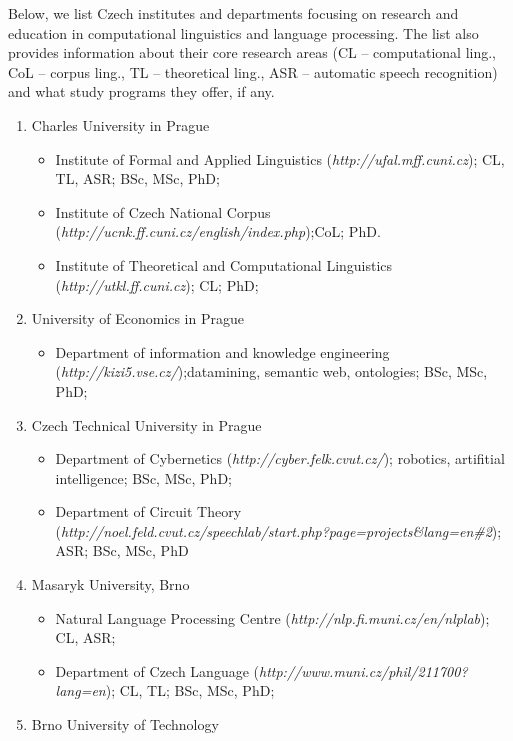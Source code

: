 \documentclass[]{../../metanetpaper}
\begin{document}
\begin{multicols}{2}
Below, we list Czech institutes and departments focusing on research and education in computational linguistics and language processing. The list also provides information about their core research areas (CL – computational ling., CoL – corpus ling., TL – theoretical ling., ASR – automatic speech recognition) and what study programs they offer, if any.

\begin{enumerate}
\item Charles University in Prague
  \begin{itemize}
  \item Institute of Formal and Applied Linguistics (\textit{http://ufal.mff.cuni.cz}); CL, TL, ASR; BSc, MSc, PhD;
  \item Institute of Czech National Corpus (\textit{http://ucnk.ff.cuni.cz/english/index.php});CoL; PhD.
  \item Institute of Theoretical and Computational Linguistics (\textit{http://utkl.ff.cuni.cz}); CL; PhD;
  \end{itemize}
\item University of Economics in Prague
  \begin{itemize}
  \item Department of information and knowledge engineering (\textit{http://kizi5.vse.cz/});datamining, semantic web, ontologies; BSc, MSc, PhD;
  \end{itemize}
\item Czech Technical University in Prague
  \begin{itemize}
  \item Department of Cybernetics (\textit{http://cyber.felk.cvut.cz/}); robotics, artifitial   intelligence; BSc, MSc, PhD;
  \item Department of Circuit Theory (\textit{http://noel.feld.cvut.cz/speechlab/start.php?page=projects\&lang=en\#2});  ASR; BSc, MSc, PhD
  \end{itemize}
\item Masaryk University, Brno
  \begin{itemize}
  \item Natural Language Processing Centre (\textit{http://nlp.fi.muni.cz/en/nlplab}); CL, ASR; 
  \item Department of Czech Language (\textit{http://www.muni.cz/phil/211700?lang=en}); CL, TL;	BSc, MSc, PhD;
  \end{itemize}
\item Brno University of Technology
  \begin{itemize}

\end{itemize}
\end{enumerate}
\end{multicols}
\end{document}

